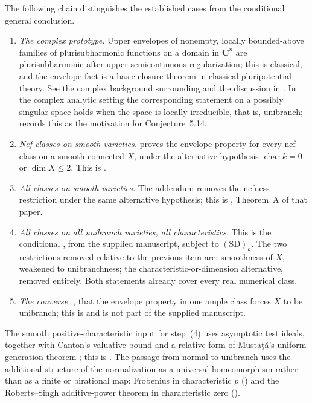 The following chain distinguishes the established cases from the
conditional general conclusion.

\begin{enumerate}
\item \emph{The complex prototype.}  Upper envelopes of nonempty, locally
      bounded-above families of plurisubharmonic functions on a domain in
      $\mathbf C^n$ are plurisubharmonic after
      upper semicontinuous regularization; this is classical, and the
      envelope fact is a basic closure theorem in classical pluripotential
theory.  See the complex background surrounding \cite{BT82} and the
discussion in \cite[\S5.2]{BJ22}.  In the complex analytic setting the corresponding
      statement on a possibly singular space holds when the space is locally
      irreducible, that is, unibranch; \cite[\S5.2]{BJ22} records this as
      the motivation for Conjecture~5.14.
\item \emph{Nef classes on smooth varieties.}  \cite[Theorem~5.20]{BJ22}
      proves the envelope property for every nef class on a smooth connected
      $X$, under the alternative hypothesis
      $\operatorname{char}k=0$ or $\dim X\le2$.  This is
      .
\item \emph{All classes on smooth varieties.}  The addendum
      \cite{BJ22b} removes the nefness restriction under the same
      alternative hypothesis; this is ,
      Theorem~A of that paper.
\item \emph{All classes on all unibranch varieties, all characteristics.}
      This is the conditional , from the
      supplied manuscript, subject to $\mathrm{(SD)}_k$.
      The two restrictions removed relative to the previous item are:
      smoothness of $X$, weakened to unibranchness; the
      characteristic-or-dimension alternative, removed entirely.
      Both statements already cover every real numerical class.
\item \emph{The converse.}  \cite[Theorem~5.12]{BJ22}, that the envelope
      property in one ample class forces $X$ to be unibranch; this is
       and is not part of the supplied
      manuscript.
\end{enumerate}

The smooth positive-characteristic input for step~(4) uses
asymptotic test ideals, together with Canton's valuative bound
\cite{Canton} and a relative form of Musta\c t\u a's uniform generation
theorem \cite{MustataTest}; this is
.  The passage from normal to unibranch
uses the additional structure of the
normalization as a universal homeomorphism rather than as a finite or
birational map: Frobenius in characteristic $p$
() and the Roberts--Singh
additive-power theorem \cite{RobertsSingh} in characteristic zero
().

